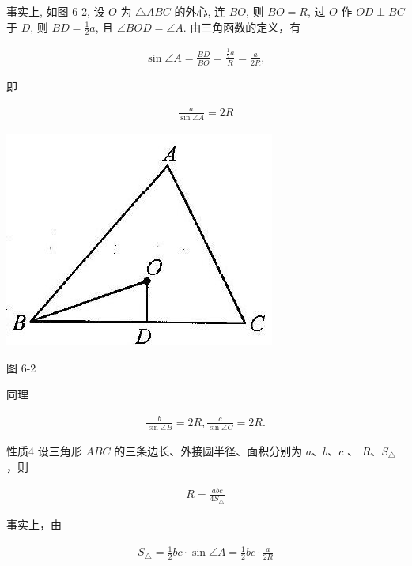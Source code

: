 \documentclass[10pt]{article}
\begin{document}
事实上, 如图 6-2, 设 $O$ 为 $\triangle A B C$ 的外心, 连 $B O$, 则 $B O=R$, 过 $O$ 作 $O D \perp B C$ 于 $D$, 则 $B D=\frac{1}{2} a$, 且 $\angle B O D=\angle A$. 由三角函数的定义，有

\begin{align*}
\sin \angle A=\frac{B D}{B O}=\frac{\frac{1}{2} a}{R}=\frac{a}{2 R},
\end{align*}

即

\begin{align*}
\frac{a}{\sin \angle A}=2 R
\end{align*}

\begin{center}
\includegraphics[max width=\textwidth]{2024_10_30_2c8f45efd4a519b08e1ag-058}
\end{center}

图 6-2

同理

\begin{align*}
\frac{b}{\sin \angle B}=2 R, \frac{c}{\sin \angle C}=2 R .
\end{align*}

性质4 设三角形 $A B C$ 的三条边长、外接圆半径、面积分别为 $a 、 b 、 c$ 、 $R 、 S_{\triangle}$ ，则

\begin{align*}
R=\frac{a b c}{4 S_{\triangle}} \tag{6-5}
\end{align*}

事实上，由

\begin{align*}
S_{\triangle}=\frac{1}{2} b c \cdot \sin \angle A=\frac{1}{2} b c \cdot \frac{a}{2 R}
\end{align*}
\end{document}
